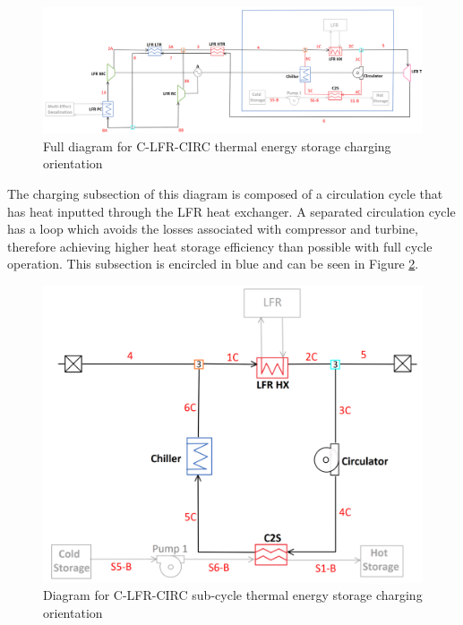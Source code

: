 \begin{figure}[H]
    \widefigure
    \includegraphics[width=\linewidth]{Definitions/c-lfr-circ.pdf}
    \caption{Full diagram for C-LFR-CIRC thermal energy storage charging orientation\label{c-lfr-circ}}
\end{figure}
\begin{paracol}{2}
\linenumbers
\switchcolumn

The charging subsection of this diagram is composed of a circulation cycle that has heat inputted through the LFR heat exchanger. A separated circulation cycle has a loop which avoids the losses associated with compressor and turbine, therefore achieving higher heat storage efficiency than possible with full cycle operation. This subsection is encircled in blue and can be seen in Figure \ref{c-lfr-circ-sub}.

 

\end{paracol}
\begin{figure}[H]
    \widefigure
    \includegraphics[width=8 cm]{Definitions/c-lfr-circ-sub.pdf}
    \caption{Diagram for C-LFR-CIRC sub-cycle thermal energy storage charging orientation\label{c-lfr-circ-sub}}
\end{figure}
